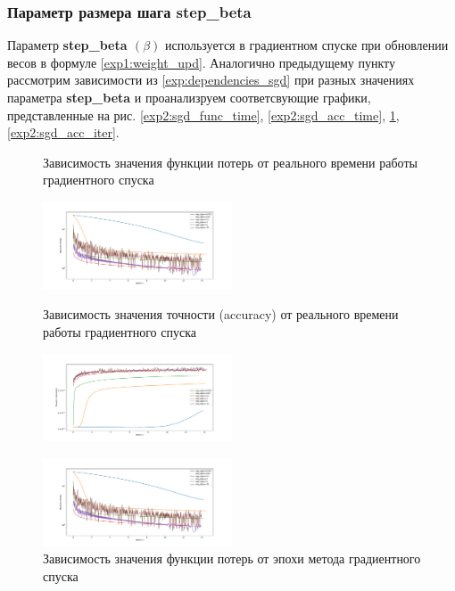 \documentclass[a4paper, 11pt]{article}
\begin{document}
            \subsubsection{Параметр размера шага step\_beta}
            Параметр \textbf{step\_beta $(\beta)$} используется в градиентном спуске при обновлении весов в формуле \ref{exp1:weight_upd}.
            Аналогично предыдущему пункту рассмотрим зависимости из \ref{exp:dependencies_sgd} при разных значениях параметра \textbf{step\_beta} и проанализруем соответсвующие графики, представленные на рис. \ref{exp2:sgd_func_time}, \ref{exp2:sgd_acc_time}, \ref{exp2:sgd_func_iter}, \ref{exp2:sgd_acc_iter}.
            
            
            \begin{figure}[H] \label{exp1}
                \begin{multicols}{2}
                    \begin{center}
                        \caption{Зависимость значения функции потерь от реального времени работы градиентного спуска} \label{exp2:sgd_func_time}
                        \includegraphics[width=0.5\textwidth, height=0.25\textheight]{../graphs/exp1_func_GD_alpha_time_beta=0,001.pdf}
                        
                        \caption{Зависимость значения точности (accuracy) от реального времени работы градиентного спуска} \label{exp2:sgd_acc_time}
                        \includegraphics[width=0.5\textwidth, height=0.25\textheight]{../graphs/exp1_accuracy_GD_alpha_time_beta=0,001.pdf}
                        
                        \caption{Зависимость значения функции потерь от эпохи метода градиентного спуска} \label{exp2:sgd_func_iter}
                        \includegraphics[width=0.5\textwidth, height=0.25\textheight]{../graphs/exp1_func_GD_alpha_time_beta=0,001.pdf}
                        

\end{center}
\end{multicols}
\end{figure}
\end{document}
